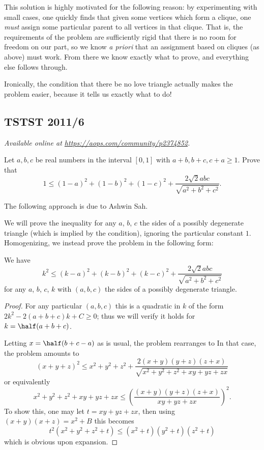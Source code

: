 \documentclass[11pt]{scrartcl}
\begin{document}
\begin{remark*}
This solution is highly motivated for the following reason:
by experimenting with small cases,
one quickly finds that given some vertices which form a clique,
one \emph{must} assign some particular parent
to all vertices in that clique.
That is, the requirements of the problem are sufficiently rigid
that there is no room for freedom on our part,
so we know \emph{a priori} that an assignment based on cliques
(as above) must work.
From there we know exactly what to prove,
and everything else follows through.

Ironically, the condition that there be no love triangle
actually makes the problem easier,
because it tells us exactly what to do!
\end{remark*}
\pagebreak

\subsection{TSTST 2011/6}
\textsl{Available online at \url{https://aops.com/community/p2374852}.}
\begin{mdframed}[style=mdpurplebox,frametitle={Problem statement}]
Let $a,b,c$ be real numbers in the interval $[0,1]$
with $a+b,b+c,c+a \ge 1$.  Prove that
\[ 1 \le (1-a)^2 + (1-b)^2 + (1-c)^2
  + \frac{2\sqrt2 abc}{\sqrt{a^2+b^2+c^2}}. \]
\end{mdframed}
The following approach is due to Ashwin Sah.

We will prove the inequality for any $a$, $b$, $c$
the sides of a possibly degenerate triangle
(which is implied by the condition),
ignoring the particular constant $1$.
Homogenizing, we instead prove the problem
in the following form:
\begin{claim*}
  We have
  \[ k^2 \le (k-a)^2 + (k-b)^2 + (k-c)^2
    + \frac{2\sqrt2 abc}{\sqrt{a^2+b^2+c^2}} \]
  for any $a$, $b$, $c$, $k$
  with $(a,b,c)$ the sides of a
  possibly degenerate triangle.
\end{claim*}
\begin{proof}
  For any particular $(a,b,c)$ this is a quadratic in $k$
  of the form $2k^2 - 2(a+b+c)k + C \ge 0$;
  thus we will verify it holds for $k = \half(a+b+c)$.

  Letting $x = \half(b+c-a)$ as is usual,
  the problem rearranges to
  In that case, the problem amounts to
  \[ (x+y+z)^2 \le x^2+y^2+z^2
    + \frac{2(x+y)(y+z)(z+x)}{\sqrt{x^2+y^2+z^2+xy+yz+zx}} \]
  or equivalently
  \[ x^2+y^2+z^2+xy+yz+zx
    \le \left( \frac{(x+y)(y+z)(z+x)}{xy+yz+zx} \right)^2. \]
  To show this, one may let $t = xy+yz+zx$,
  then using $(x+y)(x+z) = x^2+B$ this becomes
  \[ t^2(x^2+y^2+z^2+t)
    \le (x^2+t)(y^2+t)(z^2+t) \]
  which is obvious upon expansion.
\end{proof}
\end{document}
